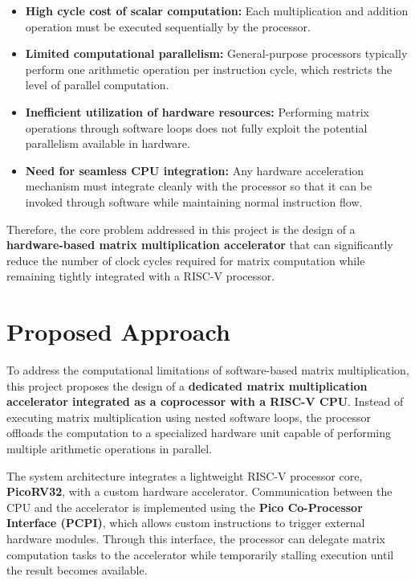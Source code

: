 ﻿\documentclass[12pt,a4paper]{report}
\begin{document}
\begin{itemize}
    \item \textbf{High cycle cost of scalar computation:} Each multiplication and addition operation must be executed sequentially by the processor.
    
    \item \textbf{Limited computational parallelism:} General-purpose processors typically perform one arithmetic operation per instruction cycle, which restricts the level of parallel computation.
    
    \item \textbf{Inefficient utilization of hardware resources:} Performing matrix operations through software loops does not fully exploit the potential parallelism available in hardware.
    
    \item \textbf{Need for seamless CPU integration:} Any hardware acceleration mechanism must integrate cleanly with the processor so that it can be invoked through software while maintaining normal instruction flow.
\end{itemize}

Therefore, the core problem addressed in this project is the design of a \textbf{hardware-based matrix multiplication accelerator} that can significantly reduce the number of clock cycles required for matrix computation while remaining tightly integrated with a RISC-V processor.

\section{Proposed Approach}

To address the computational limitations of software-based matrix multiplication, this project proposes the design of a \textbf{dedicated matrix multiplication accelerator integrated as a coprocessor with a RISC-V CPU}. 
Instead of executing matrix multiplication using nested software loops, the processor offloads the computation to a specialized hardware unit capable of performing multiple arithmetic operations in parallel.

The system architecture integrates a lightweight RISC-V processor core, \textbf{PicoRV32}, with a custom hardware accelerator. 
Communication between the CPU and the accelerator is implemented using the \textbf{Pico Co-Processor Interface (PCPI)}, which allows custom instructions to trigger external hardware modules. 
Through this interface, the processor can delegate matrix computation tasks to the accelerator while temporarily stalling execution until the result becomes available.
\end{document}
